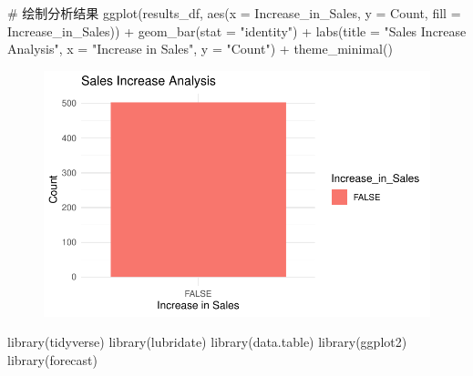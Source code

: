 \documentclass[
  letterpaper,
  DIV=11,
  numbers=noendperiod]{scrartcl}
\newenvironment{Shaded}{\begin{snugshade}}{\end{snugshade}}
\newcommand{\AttributeTok}[1]{\textcolor[rgb]{0.40,0.45,0.13}{#1}}
\newcommand{\CommentTok}[1]{\textcolor[rgb]{0.37,0.37,0.37}{#1}}
\newcommand{\FunctionTok}[1]{\textcolor[rgb]{0.28,0.35,0.67}{#1}}
\newcommand{\NormalTok}[1]{\textcolor[rgb]{0.00,0.23,0.31}{#1}}
\newcommand{\SpecialCharTok}[1]{\textcolor[rgb]{0.37,0.37,0.37}{#1}}
\newcommand{\StringTok}[1]{\textcolor[rgb]{0.13,0.47,0.30}{#1}}
\begin{document}
\begin{Shaded}
\begin{Highlighting}[]
\CommentTok{\# 绘制分析结果}
\FunctionTok{ggplot}\NormalTok{(results\_df, }\FunctionTok{aes}\NormalTok{(}\AttributeTok{x =}\NormalTok{ Increase\_in\_Sales, }\AttributeTok{y =}\NormalTok{ Count, }\AttributeTok{fill =}\NormalTok{ Increase\_in\_Sales)) }\SpecialCharTok{+}
  \FunctionTok{geom\_bar}\NormalTok{(}\AttributeTok{stat =} \StringTok{"identity"}\NormalTok{) }\SpecialCharTok{+}
  \FunctionTok{labs}\NormalTok{(}\AttributeTok{title =} \StringTok{"Sales Increase Analysis"}\NormalTok{, }\AttributeTok{x =} \StringTok{"Increase in Sales"}\NormalTok{, }\AttributeTok{y =} \StringTok{"Count"}\NormalTok{) }\SpecialCharTok{+}
  \FunctionTok{theme\_minimal}\NormalTok{()}
\end{Highlighting}
\end{Shaded}

\begin{figure}[H]

{\centering \includegraphics{Time-Serise-EDA_files/figure-pdf/unnamed-chunk-1-3.pdf}

}

\end{figure}

\begin{Shaded}
\begin{Highlighting}[]
\FunctionTok{library}\NormalTok{(tidyverse)}
\FunctionTok{library}\NormalTok{(lubridate)}
\FunctionTok{library}\NormalTok{(data.table)}
\FunctionTok{library}\NormalTok{(ggplot2)}
\FunctionTok{library}\NormalTok{(forecast)}
\end{Highlighting}
\end{Shaded}
\end{document}
